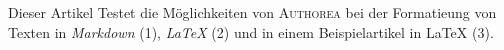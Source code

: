 Dieser Artikel Testet die Möglichkeiten von \textsc{Authorea} bei der Formatieung von Texten in \emph{Markdown} (1), \emph{LaTeX} (2) und in einem Beispielartikel in LaTeX (3).

